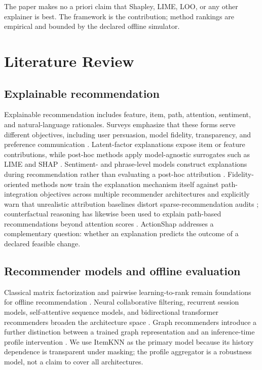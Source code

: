 \documentclass[pdflatex,sn-mathphys-num]{sn-jnl}
\theoremstyle{thmstyleone}
\theoremstyle{thmstyletwo}
\theoremstyle{thmstylethree}
\begin{document}
The paper makes no a priori claim that Shapley, LIME, LOO, or any other explainer is best. The framework is the contribution; method rankings are empirical and bounded by the declared offline simulator.



\section{Literature Review}
\subsection{Explainable recommendation}
Explainable recommendation includes feature, item, path, attention, sentiment, and natural-language rationales. Surveys emphasize that these forms serve different objectives, including user persuasion, model fidelity, transparency, and preference communication \cite{zhang2020survey}. Latent-factor explanations expose item or feature contributions, while post-hoc methods apply model-agnostic surrogates such as LIME and SHAP \cite{peake2018,nobrega2019,ribeiro2016,lundberg2017}. Sentiment- and phrase-level models construct explanations during recommendation rather than evaluating a post-hoc attribution \cite{zhang2014}. Fidelity-oriented methods now train the explanation mechanism itself against path-integration objectives across multiple recommender architectures and explicitly warn that unrealistic attribution baselines distort sparse-recommendation audits \cite{barkan2026spinrec}; counterfactual reasoning has likewise been used to explain path-based recommendations beyond attention scores \cite{li2024tkde}. ActionShap addresses a complementary question: whether an explanation predicts the outcome of a declared feasible change.

\subsection{Recommender models and offline evaluation}
Classical matrix factorization and pairwise learning-to-rank remain foundations for offline recommendation \cite{koren2009,joachims2002,rendle2009,burges2005}. Neural collaborative filtering, recurrent session models, self-attentive sequence models, and bidirectional transformer recommenders broaden the architecture space \cite{he2017ncf,hidasi2016gru4rec,kang2018sasrec,sun2019bert4rec}. Graph recommenders introduce a further distinction between a trained graph representation and an inference-time profile intervention \cite{wang2019ngcf,he2020lightgcn}. We use ItemKNN as the primary model because its history dependence is transparent under masking; the profile aggregator is a robustness model, not a claim to cover all architectures.
\end{document}
